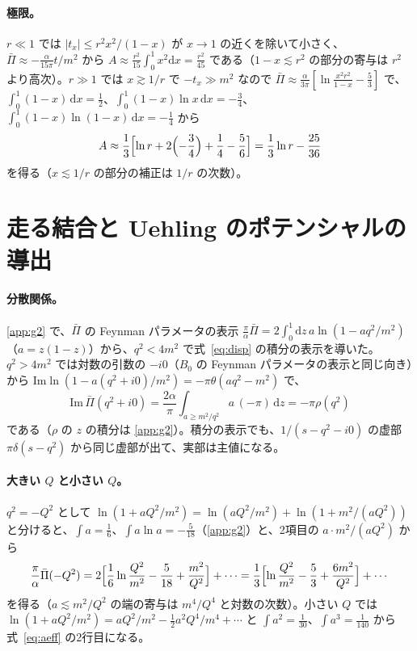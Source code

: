 \documentclass[a4paper,10pt]{ltjsarticle}
\newcommand{\dd}{\mathrm{d}}
\begin{document}
\paragraph{極限。}$r\ll1$ では $|t_x|\le r^2x^2/(1-x)$ が $x\to1$ の近くを除いて小さく、$\bar\Pi\approx-\frac{\alpha}{15\pi}t/m^2$ から $A\approx\frac{r^2}{15}\int_0^1x^2\dd x=\frac{r^2}{45}$ である（$1-x\lesssim r^2$ の部分の寄与は $r^2$ より高次）。$r\gg1$ では $x\gtrsim1/r$ で $-t_x\gg m^2$ なので $\bar\Pi\approx\frac\alpha{3\pi}[\ln\frac{x^2r^2}{1-x}-\frac53]$ で、$\int_0^1(1-x)\,\dd x=\frac12$、$\int_0^1(1-x)\ln x\,\dd x=-\frac34$、$\int_0^1(1-x)\ln(1-x)\,\dd x=-\frac14$ から
\begin{equation*}
A\approx\frac13\Bigl[\ln r+2\Bigl(-\frac34\Bigr)+\frac14-\frac56\Bigr]=\frac13\ln r-\frac{25}{36}
\end{equation*}
を得る（$x\lesssim1/r$ の部分の補正は $1/r$ の次数）。

\section{走る結合と Uehling のポテンシャルの導出}\label{app:run}

\paragraph{分散関係。}\ref{app:g2} で、$\bar\Pi$ の Feynman パラメータの表示 $\frac\pi\alpha\bar\Pi=2\int_0^1\dd z\,a\ln(1-aq^2/m^2)$（$a=z(1-z)$）から、$q^2<4m^2$ で式~\eqref{eq:disp} の積分の表示を導いた。$q^2>4m^2$ では対数の引数の $-i0$（$B_0$ の Feynman パラメータの表示と同じ向き）から $\mathrm{Im}\ln(1-a(q^2+i0)/m^2)=-\pi\theta(aq^2-m^2)$ で、
\begin{equation*}
\mathrm{Im}\,\bar\Pi(q^2+i0)=\frac{2\alpha}{\pi}\int_{a\ge m^2/q^2}a\,(-\pi)\,\dd z=-\pi\rho(q^2)
\end{equation*}
である（$\rho$ の $z$ の積分は \ref{app:g2}）。積分の表示でも、$1/(s-q^2-i0)$ の虚部 $\pi\delta(s-q^2)$ から同じ虚部が出て、実部は主値になる。

\paragraph{大きい $Q$ と小さい $Q$。}$q^2=-Q^2$ として $\ln(1+aQ^2/m^2)=\ln(aQ^2/m^2)+\ln(1+m^2/(aQ^2))$ と分けると、$\int a=\frac16$、$\int a\ln a=-\frac5{18}$（\ref{app:g2}）と、2項目の $a\cdot m^2/(aQ^2)$ から
\begin{equation*}
\frac\pi\alpha\bar\Pi(-Q^2)=2\Bigl[\frac16\ln\frac{Q^2}{m^2}-\frac5{18}+\frac{m^2}{Q^2}\Bigr]+\cdots=\frac13\Bigl[\ln\frac{Q^2}{m^2}-\frac53+\frac{6m^2}{Q^2}\Bigr]+\cdots
\end{equation*}
を得る（$a\lesssim m^2/Q^2$ の端の寄与は $m^4/Q^4$ と対数の次数）。小さい $Q$ では $\ln(1+aQ^2/m^2)=aQ^2/m^2-\frac12a^2Q^4/m^4+\cdots$ と $\int a^2=\frac1{30}$、$\int a^3=\frac1{140}$ から式~\eqref{eq:aeff} の2行目になる。
\end{document}
